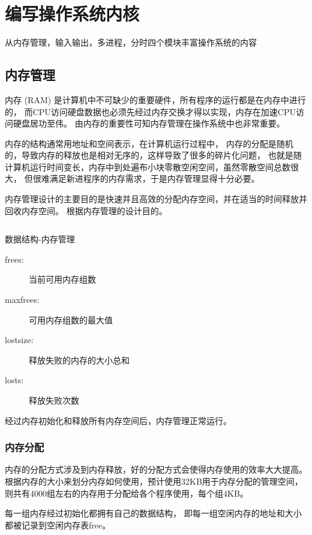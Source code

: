 \chapter{编写操作系统内核}

从内存管理，输入输出，多进程，分时四个模块丰富操作系统的内容

\section{内存管理}

内存 (RAM) 是计算机中不可缺少的重要硬件，所有程序的运行都是在内存中进行的，
而CPU访问硬盘数据也必须先经过内存交换才得以实现，内存在加速CPU访问硬盘居功至伟。
由内存的重要性可知内存管理在操作系统中也非常重要。	

内存的结构通常用地址和空间表示，在计算机运行过程中，
内存的分配是随机的，导致内存的释放也是相对无序的，这样导致了很多的碎片化问题，
也就是随计算机运行时间变长，内存中到处遍布小块零散空闲空间，虽然零散空间总数很大，
但很难满足新进程序的内存需求，于是内存管理显得十分必要。

内存管理设计的主要目的是快速并且高效的分配内存空间，并在适当的时间释放并回收内存空间。
根据内存管理的设计目的。

\begin{listing}[H]
  \inputminted[tabsize=2, firstline=137, lastline=143,
    linenos=true]{c}{../ZOS/src/kernel/bootpack.h}
  \caption{数据结构-内存管理}
  \label{lst:mem}
\end{listing}

\begin{description}
\item[frees:]当前可用内存组数
\item[maxfrees:]可用内存组数的最大值
\item[lostsize:]释放失败的内存的大小总和
\item[losts:]释放失败次数
\end{description}

经过内存初始化和释放所有内存空间后，内存管理正常运行。

\subsection{内存分配}

内存的分配方式涉及到内存释放，好的分配方式会使得内存使用的效率大大提高。
根据内存的大小来划分内存如何使用，预计使用32KB用于内存分配的管理空间，
则共有4000组左右的内存用于分配给各个程序使用，每个组4KB。

每一组内存经过初始化都拥有自己的数据结构，
即每一组空闲内存的地址和大小都被记录到空闲内存表free。

